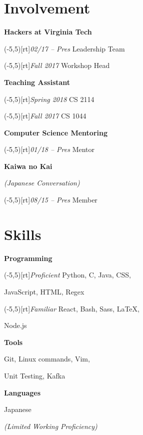 \documentclass[9pt]{extarticle}
\newcommand{\sidebox}[1]{\makebox(-5,5)[rt]{#1}}
\newcommand{\sidenote}[1]{\scriptsize\color{info}\textit{#1}}
\newcommand{\Subsection}[2]{
    {\normalsize\color{subsection}\textbf{#1}}
    \begin{trivlist}
        \color{bullet}
        #2
    \end{trivlist}
}
\newcommand{\ChronoItem}[2]{
    \item {%
        \sidebox{\sidenote{#2}}%
        \color{bullet}#1
    }
}
\newcommand{\InfoItem}[1]{
    \item {%
        \color{info}\textit{(#1)}
    }
}
\newcommand{\vsubspace}{\vspace{1.5em}}
\newcommand{\vsmallspace}{\vspace{1em}}
\newcommand{\vrightspace}{\vfill}
\begin{document}
\begin{paracol}{2}
\begin{rightcolumn}
        \section{Involvement}
            \Subsection{Hackers at Virginia Tech}{
                \ChronoItem{Leadership Team}{02/17 – Pres}
                \ChronoItem{Workshop Head}{Fall 2017}
            }
            \vsmallspace
            \Subsection{Teaching Assistant}{
                \ChronoItem{CS 2114}{Spring 2018}
                \ChronoItem{CS 1044}{Fall 2017}
            }
            \vsmallspace
            \Subsection{Computer Science Mentoring}{
                \ChronoItem{Mentor}{01/18 – Pres}
            }
            \vsmallspace
            \Subsection{Kaiwa no Kai}{
                \InfoItem{Japanese Conversation}
                \ChronoItem{Member}{08/15 – Pres}
            }
        \vrightspace
        \section{Skills}
            \Subsection{Programming}{
                \ChronoItem{Python, C, Java, CSS,}{Proficient}
                \item JavaScript, HTML, Regex
                \ChronoItem{React, Bash, Sass, LaTeX,}{Familiar}
                \item Node.js
            }
            \vsubspace
            \Subsection{Tools}{
                \item Git, Linux commands, Vim,
                \item Unit Testing, Kafka
            }
            \vsubspace
            \Subsection{Languages}{
                \item Japanese
                \InfoItem{Limited Working Proficiency}
            }
    \end{rightcolumn}
\end{paracol}
\end{document}
